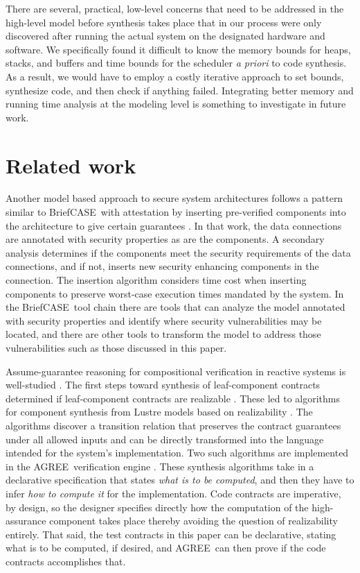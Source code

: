\documentclass[global,twocolumn]{svjour}
\newcommand{\brfcs}{BriefCASE}
\newcommand{\agr}{AGREE}
\begin{document}
There are several, practical, low-level concerns that need to be addressed in the high-level model before synthesis takes place that in our process were only discovered after running the actual system on the designated hardware and software.
%
We specifically found it difficult to know the memory bounds for heaps, stacks, and buffers and time bounds for the scheduler \emph{a priori} to code synthesis.
%
As a result, we would have to employ a costly iterative approach to set bounds, synthesize code, and then check if anything failed.
%
Integrating better memory and running time analysis at the modeling level is something to investigate in future work.

\section{Related work}
\label{sec:related-work}

Another model based approach to secure system architectures follows a pattern similar to \brfcs\ with attestation by inserting pre-verified components into the architecture to give certain guarantees \cite{6209212}.
%
In that work, the data connections are annotated with security properties as are the components.
%
A secondary analysis determines if the components meet the security requirements of the data connections, and if not, inserts new security enhancing components in the connection.
%
The insertion algorithm considers time cost when inserting components to preserve worst-case execution times mandated by the system.
%
In the \brfcs\ tool chain there are tools that can analyze the model annotated with security properties and identify where security vulnerabilities may be located, and there are other tools to transform the model to address those vulnerabilities such as those discussed in this paper.

Assume-guarantee reasoning for compositional verification in reactive systems is well-studied \cite{10.1007/978-3-642-28891-3_13, 10.1145/2658982.2527272, 10.1007/978-3-319-17524-9_7}.
%
The first steps toward synthesis of leaf-component contracts determined if leaf-component contracts are realizable \cite{10.1007/978-3-319-17524-9_13, 10.1007/978-3-319-29613-5_7}.
%
These led to algorithms for component synthesis from Lustre models based on realizability \cite{katis2017synthesis, 10.1007/978-3-319-89963-3_10}.
%
The algorithms discover a transition relation that preserves the contract guarantees under all allowed inputs and can be directly transformed into the language intended for the system's implementation.
%
Two such algorithms are implemented in the \agr\ verification engine \cite{jkind}.
%
These synthesis algorithms take in a declarative specification that states \emph{what is to be computed}, and then they have to infer \emph{how to compute it} for the implementation.
%
Code contracts are imperative, by design, so the designer specifies directly how the computation of the high-assurance component takes place thereby avoiding the question of realizability entirely.
%
That said, the test contracts in this paper can be declarative, stating what is to be computed, if desired, and \agr\ can then prove if the code contracts accomplishes that.
\end{document}
